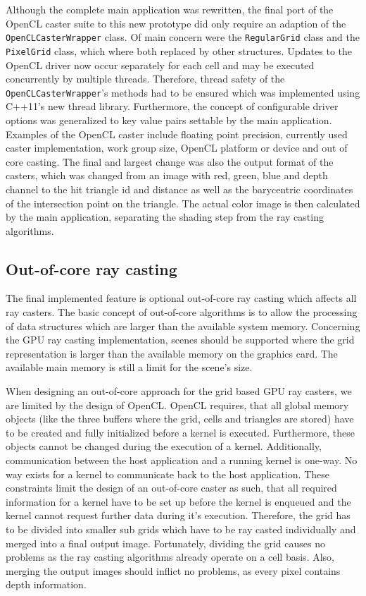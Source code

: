 Although the complete main application was rewritten, the final port of the OpenCL caster suite to this new prototype did only require an adaption of the \lstinline!OpenCLCasterWrapper! class. Of main concern were the \lstinline!RegularGrid! class and the \lstinline!PixelGrid! class, which where both replaced by other structures. Updates to the OpenCL driver now occur separately for each cell and may be executed concurrently by multiple threads. Therefore, thread safety of the \lstinline!OpenCLCasterWrapper!'s methods had to be ensured which was implemented using C++11's new thread library. Furthermore, the concept of configurable driver options was generalized to key value pairs settable by the main application. Examples of the OpenCL caster include floating point precision, currently used caster implementation, work group size, OpenCL platform or device and out of core casting. The final and largest change was also the output format of the casters, which was changed from an image with red, green, blue and depth channel to the hit triangle id and distance as well as the barycentric coordinates of the intersection point on the triangle. The actual color image is then calculated by the main application, separating the shading step from the ray casting algorithms.


\subsection{Out-of-core ray casting}
\label{sec:out_of_core}

The final implemented feature is optional out-of-core ray casting which affects all ray casters. The basic concept of out-of-core algorithms is to allow the processing of data structures which are larger than the available system memory. Concerning the GPU ray casting implementation, scenes should be supported where the grid representation is larger than the available memory on the graphics card. The available main memory is still a limit for the scene's size.

When designing an out-of-core approach for the grid based GPU ray casters, we are limited by the design of OpenCL. OpenCL requires, that all global memory objects (like the three buffers where the grid, cells and triangles are stored) have to be created and fully initialized before a kernel is executed. Furthermore, these objects cannot be changed during the execution of a kernel. Additionally, communication between the host application and a running kernel is one-way. No way exists for a kernel to communicate back to the host application. These constraints limit the design of an out-of-core caster as such, that all required information for a kernel have to be set up before the kernel is enqueued and the kernel cannot request further data during it's execution. Therefore, the grid has to be divided into smaller sub grids which have to be ray casted individually and merged into a final output image. Fortunately, dividing the grid causes no problems as the ray casting algorithms already operate on a cell basis. Also, merging the output images should inflict no problems, as every pixel contains depth information.

